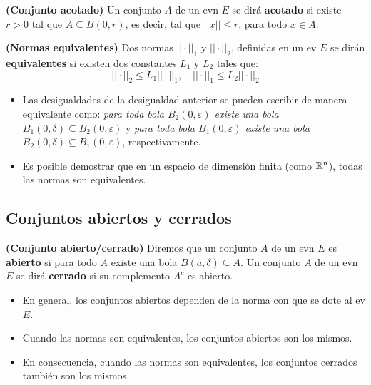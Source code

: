 \begin{definicion}
	\textbf{(Conjunto acotado)}
	Un conjunto $A$ de un evn $E$ se dirá \textbf{acotado} si existe $r > 0$ tal que $A \subseteq B(0, r )$, es decir, tal que $ || x || \leq r $, para todo $x \in A$. 	
\end{definicion}

\begin{definicion}
	\textbf{(Normas equivalentes)}
	Dos normas $||\cdot||_1$ y $||\cdot||_2$, definidas en un ev $E$ se dirán \textbf{equivalentes} si existen dos constantes $L_1$ y $L_2$ tales que: 
	$$ || \cdot ||_2 \leq L_1 || \cdot ||_1 , \quad || \cdot ||_1 \leq L_2 || \cdot ||_2 $$ 
\end{definicion}

\begin{nota}
	\begin{itemize}
		\item Las desigualdades de la desigualdad anterior se pueden escribir de manera equivalente como: \textit{para toda bola $B_2(0, \varepsilon)$ existe una bola $B_1(0, \delta) \subseteq B_2(0, \varepsilon)$} y \textit{para toda bola $B_1(0, \varepsilon)$ existe una bola $B_2(0, \delta) \subseteq B_1(0, \varepsilon)$}, respectivamente.   
		
		\item Es posible demostrar que en un espacio de dimensión finita (como $\mathbb{R}^n$), todas las normas son equivalentes. 
	\end{itemize}
\end{nota}

\subsection{Conjuntos abiertos y cerrados}

\begin{definicion}
	\textbf{(Conjunto abierto/cerrado)}
	Diremos que un conjunto $A$ de un evn $E$ es \textbf{abierto} si para todo $A$ existe una bola $B(a, \delta) \subseteq A$. Un conjunto $A$ de un evn $E$ se dirá \textbf{cerrado} si su complemento $A^c$ es abierto. 
\end{definicion}

\begin{nota}
	\begin{itemize}
		\item En general, los conjuntos abiertos dependen de la norma con que se dote al ev $E$. 
		\item Cuando las normas son equivalentes, los conjuntos abiertos son los mismos. 
		\item En consecuencia, cuando las normas son equivalentes, los conjuntos cerrados también son los mismos. 
	\end{itemize}
\end{nota}

